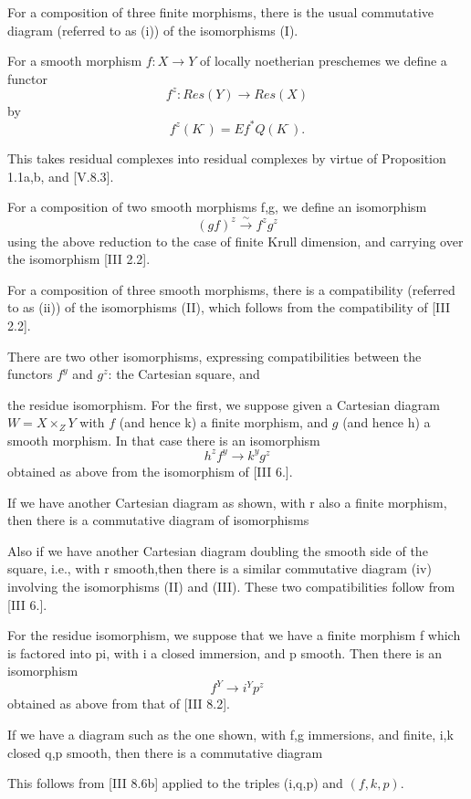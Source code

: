 \documentclass[12pt]{book}
\begin{document}
\setcounter{page}{313}
For a composition of three finite morphisms, there is the usual commutative diagram (referred to as (i)) of the isomorphisms (I).

For a smooth morphism \(f: X \to Y\) of locally noetherian preschemes we define a functor
\[f^{z}: Res(Y) \to Res(X)\]
by
\[f^{z}\left(K^{\cdot}\right)=E f^{*} Q\left(K^{\cdot}\right) .\]

This takes residual complexes into residual complexes by virtue of Proposition 1.1a,b, and [V.8.3].

For a composition of two smooth morphisms f,g, we define an isomorphism
\[(g f)^{z} \stackrel{\sim}{\to} f^{z} g^{z} \tag{II}\]
using the above reduction to the case of finite Krull dimension, and carrying over the isomorphism [III 2.2].

For a composition of three smooth morphisms, there is a compatibility (referred to as (ii)) of the isomorphisms (II), which follows from the compatibility of [III 2.2].

There are two other isomorphisms, expressing compatibilities between the functors \(f^{y}\) and \(g^{z}\): the Cartesian square, and

\setcounter{page}{314}
the residue isomorphism. For the first, we suppose given a Cartesian diagram
\(W = X \times_{Z} Y\)
with \(f\) (and hence k) a finite morphism, and \(g\) (and hence h) a smooth morphism. In that case there is an isomorphism
\[h^{z} f^{y} \to k^{y} g^{z} \tag{III}\]
obtained as above from the isomorphism of [III 6.].

If we have another Cartesian diagram as shown, with r also a finite morphism, then there is a commutative diagram of isomorphisms

\setcounter{page}{315}
Also if we have another Cartesian diagram doubling the smooth side of the square, i.e., with r smooth,then there is a similar commutative diagram (iv) involving the isomorphisms (II) and (III). These two compatibilities follow from [III 6.].

For the residue isomorphism, we suppose that we have a finite morphism f which is factored into pi, with i a closed immersion, and p smooth. Then there is an isomorphism
\[f^{Y} \to i^{Y} p^{z} \tag{IV}\]
obtained as above from that of [III 8.2].

If we have a diagram such as the one shown, with f,g immersions, and finite, i,k closed q,p smooth, then there is a commutative diagram

\setcounter{page}{316}
This follows from [III 8.6b] applied to the triples (i,q,p) and \((f, k, p)\).
\end{document}
